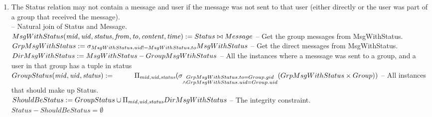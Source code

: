 \documentclass{article}
\newcommand{\var}[1]{\mathit{#1}}
\begin{document}
\begin{enumerate}
 
\item
The Status relation may not contain a message and user if the message was not sent to that user (either directly or the user was part of a group that received the message). \\ [5pt]
\hspace*{1cm} -- Natural join of Status and Message.\\ [5pt]
$
MsgWithStatus(\var{mid}, \var{uid}, \var{status}, \var{from}, \var{to}, \var{content}, \var{time}) := 
	Status \bowtie Message \\ [5pt]
$ 
\hspace*{1cm} -- Get the group messages from MsgWithStatus. \\ [5pt]
$
GrpMsgWithStatus :=
	\sigma_{MsgWithStatus.uid != MsgWithStatus.to} MsgWithStatus \\ [5pt]
$
\hspace*{1cm} -- Get the direct messages from MsgWithStatus. \\ [5pt]
$
DirMsgWithStatus :=
	MsgWithStatus - GroupMsgWtihStatus \\ [5pt]
$
\hspace*{1cm} -- All the instances where a messsage was sent to a group, and a user in that \hspace*{1cm}group has a tuple in status \\ [5pt]
$
GroupStatus(\var{mid}, \var{uid}, \var{status}) := \\ [5pt]
	\hspace*{1cm}\Pi_{\var{mid}, \var{uid}, \var{status}}
	(\sigma_{\substack{GrpMsgWithStatus.to = Group.gid \\
			\wedge GrpMsgWithStatus.uid = Group.uid}}
			(GrpMsgWithStatus \times Group)) \\ [5pt]
$
\hspace*{1cm} -- All instances that should make up Status. \\ [5pt]
$
ShouldBeStatus :=
	GroupStatus \cup
	\Pi_{\var{mid}, \var{uid}, \var{status}} DirMsgWithStatus \\ [5pt]
$
\hspace*{1cm} -- The integrity constraint. \\ [5pt]
$
Status - ShouldBeStatus = \emptyset
$
\end{enumerate}
\end{document}
